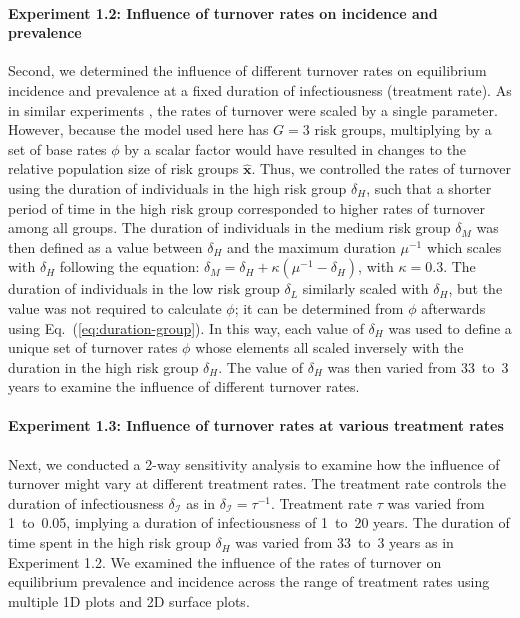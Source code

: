\paragraph{Experiment 1.2: Influence of turnover rates on incidence and prevalence}
\label{p:exp-turnover-1D}
Second, we determined the influence of different turnover rates on
equilibrium incidence and prevalence
at a fixed duration of infectiousness (treatment rate).
As in similar experiments \citep{Zhang2012,Henry2015},
the rates of turnover were scaled by a single parameter.
However, because the model used here has $G = 3$ risk groups,
multiplying by a set of base rates $\phi$ by a scalar factor
would have resulted in changes to the relative population size of risk groups $\bm{\hat{x}}$.
Thus, we controlled the rates of turnover using
the duration of individuals in the high risk group $\delta_H$,
such that a shorter period of time in the high risk group
corresponded to higher rates of turnover among all groups.
The duration of individuals in the medium risk group $\delta_M$
was then defined as a value between $\delta_H$ and the maximum duration $\mu^{-1}$
which scales with $\delta_H$ following the equation:
$\delta_M = \delta_H + \kappa \left(\mu^{-1} - \delta_H\right)$, with $\kappa = 0.3$.
The duration of individuals in the low risk group $\delta_L$
similarly scaled with $\delta_H$,
but the value was not required to calculate $\phi$;
it can be determined from $\phi$ afterwards
using Eq.~(\ref{eq:duration-group}).
In this way, each value of $\delta_H$ was used to define a unique set of turnover rates $\phi$
whose elements all scaled inversely with the duration in the high risk group $\delta_H$.
The value of $\delta_H$ was then varied from 33~to~3 years
to examine the influence of different turnover rates.
\paragraph{Experiment 1.3: Influence of turnover rates at various treatment rates}
\label{p:exp-turnover-2D}
Next, we conducted a 2-way sensitivity analysis to examine how
the influence of turnover might vary at different treatment rates.
The treatment rate controls the duration of infectiousness $\delta_{\mathcal{I}}$
as in $\delta_{\mathcal{I}} = \tau^{-1}$.
Treatment rate $\tau$ was varied from 1~to~0.05,
implying a duration of infectiousness of 1~to~20 years.
The duration of time spent in the high risk group $\delta_H$
was varied from 33~to~3 years as in Experiment 1.2.
We examined the influence of the rates of turnover on
equilibrium prevalence and incidence across the
range of treatment rates using multiple 1D plots and 2D surface plots.
